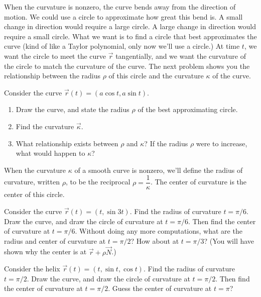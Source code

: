When the curvature is nonzero, the curve bends away from the direction of motion.  We could use a circle to approximate how great this bend is. A small change in direction would require a large circle.  A large change in direction would require a small circle. 
What we want is to find a circle that best approximates the curve (kind of like a Taylor polynomial, only now we'll use a circle.) At time $t$, we want the circle to meet the curve $\vec r$ tangentially, and we want the curvature of the circle to match the curvature of the curve.  The next problem shows you the relationship between the radius $\rho$ of this circle and the curvature $\kappa$ of the curve.

\begin{problem}
 Consider the curve $\vec r(t)=(a\cos t, a\sin t)$.
 \begin{enumerate}
  \item Draw the curve, and state the radius $\rho$ of the best approximating circle.
  \item Find the curvature $\vec \kappa$.
  \item What relationship exists between $\rho$ and $\kappa$?  If the radius $\rho$ were to increase, what would happen to $\kappa$?
 \end{enumerate}
\end{problem}


\begin{definition}%
When the curvature $\kappa$ of a smooth curve is nonzero, we'll define the radius of curvature, written $\rho$, to be the reciprocal $\rho = \dfrac{1}{\kappa}$. The center of curvature is the center of this circle.
\end{definition}

\begin{problem}
 Consider the curve $\vec r(t)=(t,\sin 3 t)$. Find the radius of curvature $t=\pi/6$. Draw the curve, and draw the circle of curvature at $t=\pi/6$. Then find the center of curvature at $t=\pi/6$. Without doing any more computations, what are the radius and center of curvature at $t=\pi/2$?  How about at $t=\pi/3$? (You will have shown why the center is at $\vec r + \rho \vec N$.)
\end{problem}

\begin{problem}
 Consider the helix $\vec r(t)=(t,\sin t,\cos t)$. Find the radius of curvature $t=\pi/2$. Draw the curve, and draw the circle of curvature at $t=\pi/2$. Then find the center of curvature at $t=\pi/2$. Guess the center of curvature at $t=\pi$?
\end{problem}

